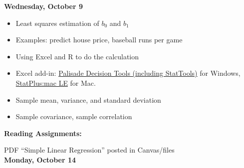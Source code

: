 \documentclass[11pt]{article}
\begin{document}
\vspace{5mm}
\noindent\textbf{\large Wednesday, October 9}	

\begin{itemize}
\item Least squares estimation of $b_0$ and $b_1$
\item Examples: predict house price, baseball runs per game
\item Using Excel and R to do the calculation
\item Excel add-in: 
 \href{https://wikis.utexas.edu/display/MSBTech/Palisade+Decision+Tools}{\textcolor[rgb]{0.00,0.00,1.00}{Palisade Decision Tools (including StatTools)}}  for Windows,  \href{https://www.analystsoft.com/en/products/statplusmacle/}{\textcolor[rgb]{0.00,0.00,1.00}{StatPlus:mac LE}} for Mac.

\item Sample mean, variance, and standard deviation
\item Sample covariance, sample correlation

\end{itemize}



\noindent\textbf{Reading Assignments:}

PDF ``Simple Linear Regression'' posted in Canvas/files\\





\vspace{5mm}
\noindent\textbf{\large Monday, October 14} 	
\end{document}
